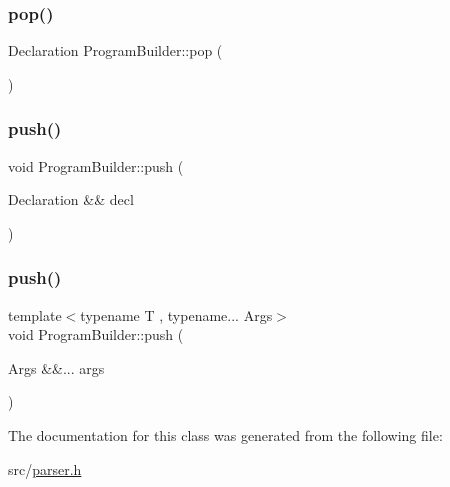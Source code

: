 \subsubsection{\texorpdfstring{pop()}{pop()}}
{\footnotesize\ttfamily Declaration Program\+Builder\+::pop (\begin{DoxyParamCaption}{ }\end{DoxyParamCaption})\hspace{0.3cm}{\ttfamily [inline]}}

\mbox{\label{class_program_builder_af708c9a72c89ea33d5568326e2a67d68}} 
\subsubsection{\texorpdfstring{push()}{push()}\hspace{0.1cm}{\footnotesize\ttfamily [1/2]}}
{\footnotesize\ttfamily void Program\+Builder\+::push (\begin{DoxyParamCaption}\item[{Declaration \&\&}]{decl }\end{DoxyParamCaption})\hspace{0.3cm}{\ttfamily [inline]}}

\mbox{\label{class_program_builder_a31d6f57c8b035f32713097e24d6c61a1}} 
\subsubsection{\texorpdfstring{push()}{push()}\hspace{0.1cm}{\footnotesize\ttfamily [2/2]}}
{\footnotesize\ttfamily template$<$typename T , typename... Args$>$ \\
void Program\+Builder\+::push (\begin{DoxyParamCaption}\item[{Args \&\&...}]{args }\end{DoxyParamCaption})\hspace{0.3cm}{\ttfamily [inline]}}



The documentation for this class was generated from the following file\+:\begin{DoxyCompactItemize}
\item 
src/\hyperlink{parser_8h}{parser.\+h}\end{DoxyCompactItemize}
